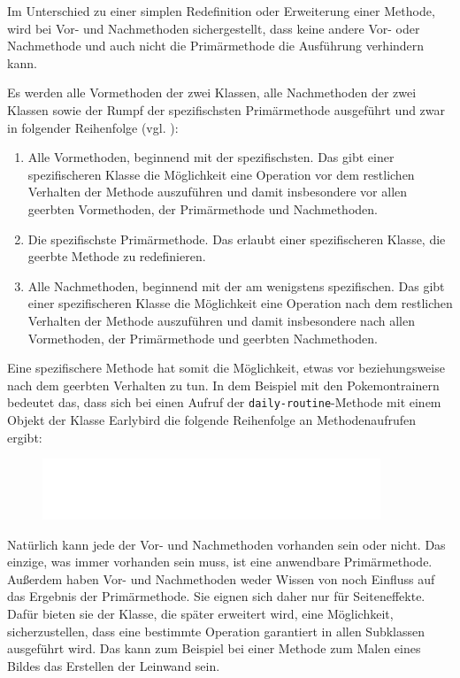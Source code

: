 Im Unterschied zu einer simplen Redefinition oder Erweiterung einer Methode, wird bei Vor- und Nachmethoden sichergestellt, dass keine andere Vor- oder Nachmethode und auch nicht die Primärmethode die Ausführung verhindern kann.

Es werden alle Vormethoden der zwei Klassen, alle Nachmethoden der zwei Klassen sowie der Rumpf der spezifischsten Primärmethode ausgeführt und zwar in folgender Reihenfolge (vgl. \cite[S. 50]{keene}):
\begin{enumerate}
 \item Alle Vormethoden, beginnend mit der spezifischsten. Das gibt einer spezifischeren Klasse die Möglichkeit eine Operation vor dem restlichen Verhalten der Methode auszuführen und damit insbesondere vor allen geerbten Vormethoden, der Primärmethode und Nachmethoden.
 \item Die spezifischste Primärmethode. Das erlaubt einer spezifischeren Klasse, die geerbte Methode zu redefinieren.
 \item Alle Nachmethoden, beginnend mit der am wenigstens spezifischen. Das gibt einer spezifischeren Klasse die Möglichkeit eine Operation nach dem restlichen Verhalten der Methode auszuführen und damit insbesondere nach allen Vormethoden, der Primärmethode und geerbten Nachmethoden.
\end{enumerate}

Eine spezifischere Methode hat somit die Möglichkeit, etwas vor beziehungsweise nach dem geerbten Verhalten zu tun. In dem Beispiel mit den Pokemontrainern bedeutet das, dass sich bei einen Aufruf der \texttt{daily-routine}-Methode mit einem Objekt der Klasse Earlybird die folgende Reihenfolge an Methodenaufrufen ergibt:

\begin{figure}[h]
 \centering
 \includegraphics[width=0.9\textwidth]{pictures/primary}
\end{figure}

Natürlich kann jede der Vor- und Nachmethoden vorhanden sein oder nicht. Das einzige, was immer vorhanden sein muss, ist eine anwendbare Primärmethode. Außerdem haben Vor- und Nachmethoden weder Wissen von noch Einfluss auf das Ergebnis der Primärmethode. Sie eignen sich daher nur für Seiteneffekte. Dafür bieten sie der Klasse, die später erweitert wird, eine Möglichkeit, sicherzustellen, dass eine bestimmte Operation garantiert in allen Subklassen ausgeführt wird. Das kann zum Beispiel bei einer Methode zum Malen eines Bildes das Erstellen der Leinwand sein.

